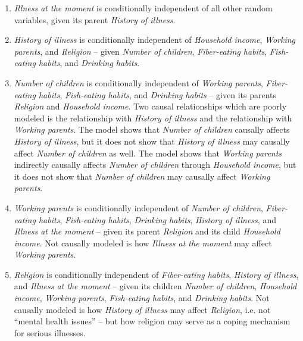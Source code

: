 \begin{enumerate}
\item \textit{Illness at the moment} is conditionally independent of all other random variables, given its parent \textit{History of illness}.

\item \textit{History of illness} is conditionally independent of \textit{Household income}, \textit{Working parents}, and \textit{Religion} -- given \textit{Number of children}, \textit{Fiber-eating habits}, \textit{Fish-eating habits}, and \textit{Drinking habits}.

\item \textit{Number of children} is conditionally independent of \textit{Working parents}, \textit{Fiber-eating habits}, \textit{Fish-eating habits}, and \textit{Drinking habits} -- given its parents \textit{Religion} and \textit{Household income}. Two causal relationships which are poorly modeled is the relationship with \textit{History of illness} and the relationship with \textit{Working parents}. The model shows that \textit{Number of children} causally affects \textit{History of illness}, but it does not show that \textit{History of illness} may causally affect \textit{Number of children} as well. The model shows that \textit{Working parents} indirectly causally affects \textit{Number of children} through \textit{Household income}, but it does not show that \textit{Number of children} may causally affect \textit{Working parents}.

\item \textit{Working parents} is conditionally independent of \textit{Number of children}, \textit{Fiber-eating habits}, \textit{Fish-eating habits}, \textit{Drinking habits}, \textit{History of illness}, and \textit{Illness at the moment} -- given its parent \textit{Religion} and its child \textit{Household income}. Not causally modeled is how \textit{Illness at the moment} may affect \textit{Working parents}.

\item \textit{Religion} is conditionally independent of \textit{Fiber-eating habits}, \textit{History of illness}, and \textit{Illness at the moment} -- given its children \textit{Number of children}, \textit{Household income}, \textit{Working parents}, \textit{Fish-eating habits}, and \textit{Drinking habits}. Not causally modeled is how \textit{History of illness} may affect \textit{Religion}, i.e. not ``mental health issues'' -- but how religion may serve as a coping mechanism for serious illnesses.


\end{enumerate}

